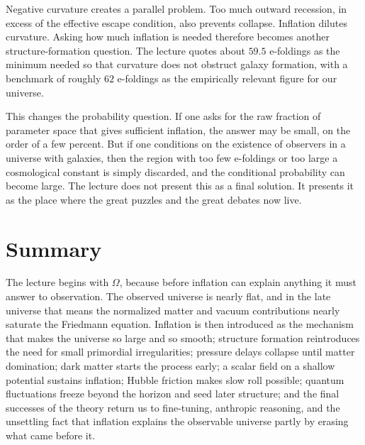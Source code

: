 Negative curvature creates a parallel problem. Too much outward recession, in excess of the effective escape condition, also prevents collapse. Inflation dilutes curvature. Asking how much inflation is needed therefore becomes another structure-formation question. The lecture quotes about \(59.5\) e-foldings as the minimum needed so that curvature does not obstruct galaxy formation, with a benchmark of roughly \(62\) e-foldings as the empirically relevant figure for our universe.

This changes the probability question. If one asks for the raw fraction of parameter space that gives sufficient inflation, the answer may be small, on the order of a few percent. But if one conditions on the existence of observers in a universe with galaxies, then the region with too few e-foldings or too large a cosmological constant is simply discarded, and the conditional probability can become large. The lecture does not present this as a final solution. It presents it as the place where the great puzzles and the great debates now live.

\section{Summary}

The lecture begins with \(\Omega\), because before inflation can explain anything it must answer to observation. The observed universe is nearly flat, and in the late universe that means the normalized matter and vacuum contributions nearly saturate the Friedmann equation. Inflation is then introduced as the mechanism that makes the universe so large and so smooth; structure formation reintroduces the need for small primordial irregularities; pressure delays collapse until matter domination; dark matter starts the process early; a scalar field on a shallow potential sustains inflation; Hubble friction makes slow roll possible; quantum fluctuations freeze beyond the horizon and seed later structure; and the final successes of the theory return us to fine-tuning, anthropic reasoning, and the unsettling fact that inflation explains the observable universe partly by erasing what came before it.